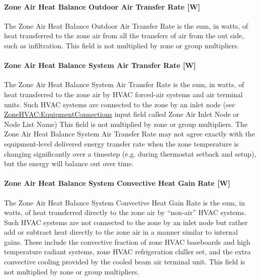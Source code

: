 \paragraph{Zone Air Heat Balance Outdoor Air Transfer Rate {[}W{]}}\label{zone-air-heat-balance-outdoor-air-transfer-rate-w}

The Zone Air Heat Balance Outdoor Air Transfer Rate is the sum, in watts, of heat transferred to the zone air from all the transfers of air from the out side, such as infiltration. This field is not multiplied by zone or group multipliers.

\paragraph{Zone Air Heat Balance System Air Transfer Rate {[}W{]}}\label{zone-air-heat-balance-system-air-transfer-rate-w}

The Zone Air Heat Balance System Air Transfer Rate is the sum, in watts, of heat transferred to the zone air by HVAC forced-air systems and air terminal units. Such HVAC systems are connected to the zone by an inlet node (see \hyperref[zonehvacequipmentconnections]{ZoneHVAC:EquipmentConnections} input field called Zone Air Inlet Node or Node List Name) This field is not multiplied by zone or group multipliers. The Zone Air Heat Balance System Air Transfer Rate may not agree exactly with the equipment-level delivered energy transfer rate when the zone temperature is changing significantly over a timestep (e.g. during thermostat setback and setup), but the energy will balance out over time.

\paragraph{Zone Air Heat Balance System Convective Heat Gain Rate {[}W{]}}\label{zone-air-heat-balance-system-convective-heat-gain-rate-w}

The Zone Air Heat Balance System Convective Heat Gain Rate is the sum, in watts, of heat transferred directly to the zone air by ``non-air'' HVAC systems. Such HVAC systems are not connected to the zone by an inlet node but rather add or subtract heat directly to the zone air in a manner similar to internal gains. These include the convective fraction of zone HVAC baseboards and high temperature radiant systems, zone HVAC refrigeration chiller set, and the extra convective cooling provided by the cooled beam air terminal unit. This field is not multiplied by zone or group multipliers.

